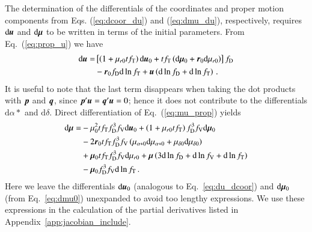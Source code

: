 \documentclass{aa}
\def\vec#1{\ensuremath{\mathchoice{\mbox{\boldmath$\displaystyle#1$}}
{\mbox{\boldmath$\textstyle#1$}}
{\mbox{\boldmath$\scriptstyle#1$}}
{\mbox{\boldmath$\scriptscriptstyle#1$}}}}
\begin{document}
The determination of the differentials of the coordinates and proper motion components from Eqs. (\ref{eq:dcoor_du}) and (\ref{eq:dmu_du}), respectively, requires $\mathrm{d}\vec{u}$ and $\mathrm{d}\vec{\mu}$ to be written in terms of the initial parameters. From Eq.~(\ref{eq:prop_u}) we have
\begin{equation}\label{eq:du}
 \begin{aligned}
    \mathrm{d}\vec{u}=
    &\left[\left(1+\mu_{r0}tf_\mathrm{T}\right)\mathrm{d}\vec{u}_0
          +tf_\mathrm{T}\left(\mathrm{d}\vec{\mu}_0+\vec{r}_0\mathrm{d}\mu_{r0}\right)\right]f_\mathrm{D}\\
    &-\vec{r}_0f_\mathrm{D}\mathrm{d}\ln f_\mathrm{T}
    +\vec{u}\left(\mathrm{d}\ln f_\mathrm{D}+\mathrm{d}\ln f_\mathrm{T}\right)\,.
 \end{aligned}
\end{equation}
It is useful to note that the last term disappears when taking the dot products with $\vec{p}$ and $\vec{q}$, since $\vec{p}'\vec{u}=\vec{q}'\vec{u}=0$; hence it does not contribute to the differentials $\mathrm{d}\alpha*$ and $\mathrm{d}\delta$.
Direct differentiation of Eq.~(\ref{eq:mu_prop}) yields
\begin{equation}\label{eq:dmu}
 \begin{aligned}
    \mathrm{d}\vec{\mu}=
    &-\mu_0^2tf_\mathrm{T}f_\mathrm{D}^3f_\mathrm{V}\mathrm{d}\vec{u}_0
    +
    \left(1+\mu_{r0}tf_\mathrm{T}\right)f_\mathrm{D}^3f_\mathrm{V}\mathrm{d}\vec{\mu}_0\\
    &-2\vec{r}_0tf_\mathrm{T}f_\mathrm{D}^3f_\mathrm{V}
    \left(\mu_{\alpha*0}\mathrm{d}\mu_{\alpha*0}+\mu_{\delta0}\mathrm{d}\mu_{\delta0}\right)\\
    &+\vec{\mu}_0tf_\mathrm{T}f_\mathrm{D}^3f_\mathrm{V}\mathrm{d}\mu_{r0}
    +
    \vec{\mu}
    \left(3\mathrm{d}\ln f_\mathrm{D}+\mathrm{d}\ln f_\mathrm{V}+\mathrm{d}\ln f_\mathrm{T}\right)\\
    &-\vec{\mu}_0f_\mathrm{D}^3f_\mathrm{V}\mathrm{d}\ln f_\mathrm{T}\,.
 \end{aligned}
\end{equation}
 Here we leave the differentials $\mathrm{d}\vec{u}_0$ (analogous to Eq.~\ref{eq:du_dcoor})
 and $\mathrm{d}\vec{\mu}_0$ (from Eq.~\ref{eq:dmu0}) unexpanded to avoid too  lengthy expressions. We use these expressions in the calculation of the partial derivatives listed in Appendix~\ref{app:jacobian_include}.
\end{document}
